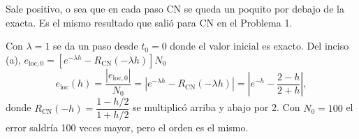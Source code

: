 Sale positivo, o sea que en cada paso CN se queda un poquito por debajo de la exacta. Es el mismo resultado que salió
para CN en el Problema 1.



Con $\lambda = 1$ se da un paso desde $t_0 = 0$ donde el valor inicial es exacto. Del inciso (a),
$e_{\mathrm{loc},0} = \left[e^{-\lambda h} - R_{\mathrm{CN}}(-\lambda h)\right] N_0$
\[
e_{\mathrm{loc}}(h) = \frac{|e_{\mathrm{loc},0}|}{N_0} = \left| e^{-\lambda h} - R_{\mathrm{CN}}(-\lambda h) \right|
= \left| e^{-h} - \frac{2 - h}{2 + h} \right| ,
\]
donde $R_{\mathrm{CN}}(-h) = \dfrac{1 - h/2}{1 + h/2}$ se multiplicó arriba y abajo por 2. Con $N_0 = 100$ el error
saldría 100 veces mayor, pero el orden es el mismo.

